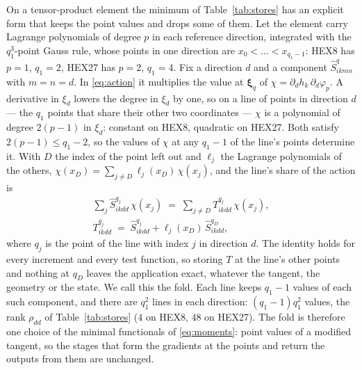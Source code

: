 \documentclass[sigconf,balance=false]{acmart}
\newcommand{\xhat}{\boldsymbol{\xi}}
\newcommand{\Sq}{\widehat{S}^{q}}
\begin{document}
On a tensor-product element the minimum of Table~\ref{tab:stores} has an explicit form that keeps
the point values and drops some of them.  Let the element carry Lagrange polynomials of degree $p$
in each reference direction, integrated with the $q_1^3$-point Gauss rule, whose points in one
direction are $x_0<\dots<x_{q_1-1}$: HEX8 has $p=1$, $q_1=2$, HEX27 has $p=2$, $q_1=4$.  Fix a direction
$d$ and a component $\Sq_{ikmn}$ with $m=n=d$.  In \eqref{eq:action} it multiplies the value at
$\xhat_q$ of $\chi=\partial_d h_k\,\partial_d\varphi_p$.  A derivative in $\xi_d$ lowers the degree in
$\xi_d$ by one, so on a line of points in direction $d$ --- the $q_1$ points that share their other
two coordinates --- $\chi$ is a polynomial of degree $2(p-1)$ in $\xi_d$: constant on HEX8,
quadratic on HEX27.  Both satisfy $2(p-1)\le q_1-2$, so the values of $\chi$ at any $q_1-1$ of the
line's points determine it.  With $D$ the index of the point left out and $\ell_j$ the Lagrange
polynomials of the others, $\chi(x_D)=\sum_{j\ne D}\ell_j(x_D)\,\chi(x_j)$, and the line's share of
the action is
\begin{equation}
  \begin{gathered}
  \sum_{j} \widehat S^{q_j}_{ikdd}\,\chi(x_j) \;=\; \sum_{j\ne D} T^{q_j}_{ikdd}\,\chi(x_j),\\
  T^{q_j}_{ikdd} \;=\; \widehat S^{q_j}_{ikdd} + \ell_j(x_D)\,\widehat S^{q_D}_{ikdd} ,
  \end{gathered}
  \label{eq:fold}
\end{equation}
where $q_j$ is the point of the line with index $j$ in direction $d$.  The identity holds for every
increment and every test function, so storing $T$ at the line's other points and nothing at $q_D$
leaves the application exact, whatever the tangent, the geometry or the state.  We call this the
fold.  Each line keeps $q_1-1$ values of each such component, and there are $q_1^2$ lines in each
direction: $(q_1-1)q_1^2$ values, the rank $\rho_{dd}$ of Table~\ref{tab:stores} ($4$ on HEX8, $48$ on
HEX27).  The fold is therefore one choice of the minimal functionals of \eqref{eq:moments}: point
values of a modified tangent, so the stages that form the gradients at the points and return the
outputs from them are unchanged.
\end{document}
